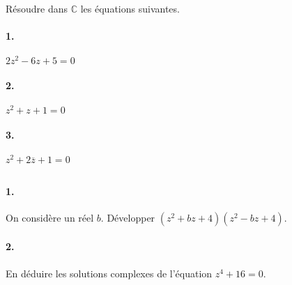 			Résoudre dans $\mathbb{C}$ les équations suivantes.

			\paragraph{1.} $2z^2-6z+5=0$
			\paragraph{2.} $z^2+z+1=0$
			\paragraph{3.} $z^2+2\overline{z}+1=0$

		\subsection{}

			\paragraph{1.} On considère un réel $b$. Développer $(z^2+bz+4)(z^2-bz+4)$.

			\paragraph{2.} En déduire les solutions complexes de l'équation $z^4 + 16=0$.